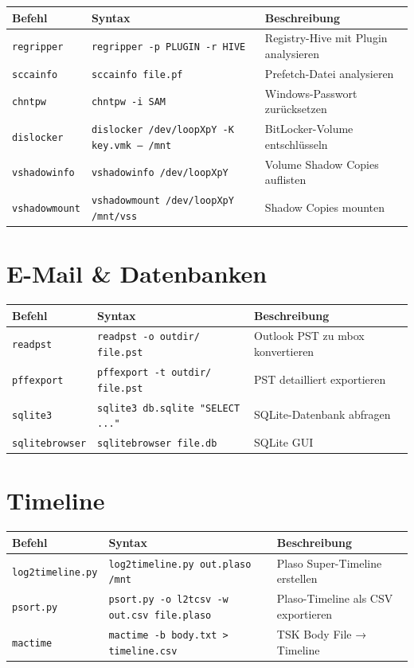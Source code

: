 {\small
\begin{tabular}{@{}p{2.4cm} p{7.6cm} p{4.5cm}@{}}
\toprule
\textbf{Befehl} & \textbf{Syntax} & \textbf{Beschreibung} \\
\midrule
\texttt{regripper} & \texttt{regripper -p PLUGIN -r HIVE} & Registry-Hive mit Plugin analysieren \\
\texttt{sccainfo} & \texttt{sccainfo file.pf} & Prefetch-Datei analysieren \\
\texttt{chntpw} & \texttt{chntpw -i SAM} & Windows-Passwort zurücksetzen \\
\texttt{dislocker} & \texttt{dislocker /dev/loopXpY -K key.vmk -- /mnt} & BitLocker-Volume entschlüsseln \\
\texttt{vshadowinfo} & \texttt{vshadowinfo /dev/loopXpY} & Volume Shadow Copies auflisten \\
\texttt{vshadowmount} & \texttt{vshadowmount /dev/loopXpY /mnt/vss} & Shadow Copies mounten \\
\bottomrule
\end{tabular}
}

\section{E-Mail \& Datenbanken}

{\small
\begin{tabular}{@{}p{2.4cm} p{7.6cm} p{4.5cm}@{}}
\toprule
\textbf{Befehl} & \textbf{Syntax} & \textbf{Beschreibung} \\
\midrule
\texttt{readpst} & \texttt{readpst -o outdir/ file.pst} & Outlook PST zu mbox konvertieren \\
\texttt{pffexport} & \texttt{pffexport -t outdir/ file.pst} & PST detailliert exportieren \\
\texttt{sqlite3} & \texttt{sqlite3 db.sqlite "SELECT ..."} & SQLite-Datenbank abfragen \\
\texttt{sqlitebrowser} & \texttt{sqlitebrowser file.db} & SQLite GUI \\
\bottomrule
\end{tabular}
}

\section{Timeline}

{\small
\begin{tabular}{@{}p{2.8cm} p{7.2cm} p{4.5cm}@{}}
\toprule
\textbf{Befehl} & \textbf{Syntax} & \textbf{Beschreibung} \\
\midrule
\texttt{log2timeline.py} & \texttt{log2timeline.py out.plaso /mnt} & Plaso Super-Timeline erstellen \\
\texttt{psort.py} & \texttt{psort.py -o l2tcsv -w out.csv file.plaso} & Plaso-Timeline als CSV exportieren \\
\texttt{mactime} & \texttt{mactime -b body.txt > timeline.csv} & TSK Body File → Timeline \\
\bottomrule
\end{tabular}
}


